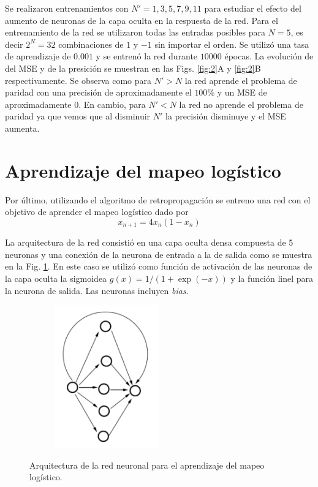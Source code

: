 \documentclass[11pt,twocolumn,twoside]{opticajnl}
\begin{document}
Se realizaron entrenamientos con $N' = 1,3,5,7,9,11$ para estudiar el efecto del aumento de neuronas de la capa oculta en la respuesta de la red. Para el entrenamiento de la red se utilizaron todas las entradas posibles para $N=5$, es decir $2^{N} = 32$ combinaciones de $1$ y $-1$ sin importar el orden. Se utilizó una tasa de aprendizaje de $0.001$ y se entrenó la red durante $10000$ épocas. La evolución de del MSE y de la presición se muestran en las Figs. \ref{fig:2}A y \ref{fig:2}B respectivamente. Se observa como para $N'>N$ la red aprende el problema de paridad con una precisión de aproximadamente el $100\%$ y un MSE de aproximadamente $0$. En cambio, para $N' < N$ la red no aprende el problema de paridad ya que vemos que al disminuir $N'$ la precisión disminuye y el MSE aumenta.

\section{Aprendizaje del mapeo logístico\label{sec:ej3}}

\vspace{0.3cm}

Por último, utilizando el algoritmo de retropropagación se entreno una red con el objetivo de aprender el mapeo logístico dado por 
\begin{equation}
    x_{n+1} = 4 x_n (1- x_n)
\end{equation}

La arquitectura de la red consistió en una capa oculta densa compuesta de 5 neuronas y una conexión de la neurona de entrada a la de salida como se muestra en la Fig. \ref{fig:esq_3}. En este caso se utilizó como función de activación de las neuronas de la capa oculta la sigmoidea $g(x) = 1/(1 + \exp{(-x)})$ y la función linel para la neurona de salida. Las neuronas incluyen \textit{bias}.

\begin{figure}[ht]
    \centering
         \begin{subfigure}[b]{0.75\linewidth}
            \centering
            \includegraphics[width=0.5\textwidth]{Figuras/esquema3.png}
         \end{subfigure}
    \caption{Arquitectura de la red neuronal para el aprendizaje del mapeo logístico.} 
    \label{fig:esq_3}
\end{figure}
\end{document}
